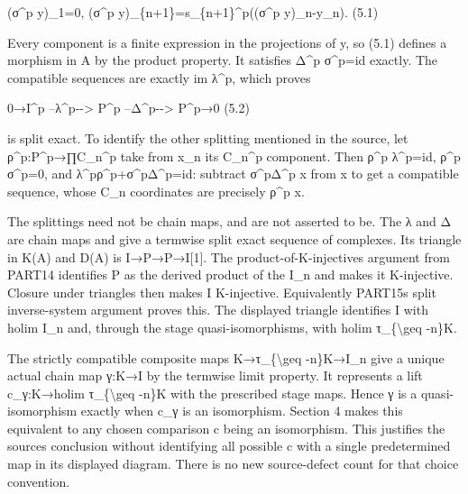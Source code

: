 (σ\^{}p y)\allowbreak{}\_\allowbreak{}1\allowbreak{}=0,\allowbreak{} (σ\^{}p y)\allowbreak{}\_\allowbreak{}\{n\allowbreak{}+1\}\allowbreak{}=s\_\allowbreak{}\{n\allowbreak{}+1\}\textasciicircum{}p((σ\textasciicircum{}p y)\allowbreak{}\_\allowbreak{}n-y\_\allowbreak{}n)\allowbreak{}. (5.1)\allowbreak{}

Every component is a finite expression in the projections of y,\allowbreak{} so (5.1)\allowbreak{} defines a morphism in A by the product property. It satisfies Δ\^{}p σ\textasciicircum{}p\allowbreak{}=id exactly. The compatible sequences are exactly im λ\textasciicircum{}p,\allowbreak{} which proves

0\allowbreak{}→I\textasciicircum{}p --λ\textasciicircum{}p-\allowbreak{}-> P\^{}p --Δ\textasciicircum{}p-\allowbreak{}-> P\textasciicircum{}p\allowbreak{}→0 (5.2)\allowbreak{}

is split exact. To identify the other splitting mentioned in the source,\allowbreak{} let ρ\textasciicircum{}p:\allowbreak{}P\textasciicircum{}p\allowbreak{}→∏C\_\allowbreak{}n\textasciicircum{}p take from x\_\allowbreak{}n its C\_\allowbreak{}n\textasciicircum{}p component. Then ρ\^{}p λ\textasciicircum{}p\allowbreak{}=id,\allowbreak{} ρ\^{}p σ\textasciicircum{}p\allowbreak{}=0,\allowbreak{} and λ\textasciicircum{}pρ\textasciicircum{}p\allowbreak{}+σ\textasciicircum{}pΔ\textasciicircum{}p\allowbreak{}=id:\allowbreak{} subtract σ\^{}pΔ\^{}p x from x to get a compatible sequence,\allowbreak{} whose C\_\allowbreak{}n coordinates are precisely ρ\^{}p x.

The splittings need not be chain maps,\allowbreak{} and are not asserted to be. The λ and Δ are chain maps and give a termwise split exact sequence of complexes. Its triangle in K(A)\allowbreak{} and D(A)\allowbreak{} is I\allowbreak{}→P\allowbreak{}→P\allowbreak{}→I[1]\allowbreak{}. The product-of-K-injectives argument from PART14 identifies P as the derived product of the I\_\allowbreak{}n and makes it K-injective. Closure under triangles then makes I K-injective. Equivalently PART15\textquotesingle s split inverse-system argument proves this. The displayed triangle identifies I with holim I\_\allowbreak{}n and,\allowbreak{} through the stage quasi-isomorphisms,\allowbreak{} with holim τ\_\allowbreak{}\{\textbackslash{}geq -n\}K.

The strictly compatible composite maps K\allowbreak{}→τ\_\allowbreak{}\{\textbackslash{}geq -n\}K\allowbreak{}→I\_\allowbreak{}n give a unique actual chain map γ:\allowbreak{}K\allowbreak{}→I by the termwise limit property. It represents a lift c\_\allowbreak{}γ:\allowbreak{}K\allowbreak{}→holim τ\_\allowbreak{}\{\textbackslash{}geq -n\}K with the prescribed stage maps. Hence γ is a quasi-isomorphism exactly when c\_\allowbreak{}γ is an isomorphism. Section 4 makes this equivalent to any chosen comparison c being an isomorphism. This justifies the source\textquotesingle s conclusion without identifying all possible c with a single predetermined map in its displayed diagram. There is no new source-defect count for that choice convention.

